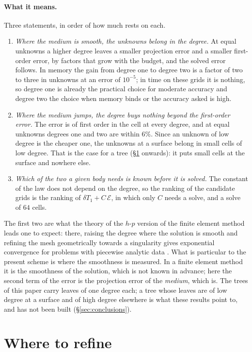 \documentclass[11pt,a4paper]{article}
\newcommand{\cE}{\mathcal{E}}
\begin{document}
\paragraph{What it means.} Three statements, in order of how much rests on each.
\begin{enumerate}
\item \emph{Where the medium is smooth, the unknowns belong in the degree.} At equal unknowns a higher
degree leaves a smaller projection error and a smaller first-order error, by factors that grow with the
budget, and the solved error follows. In memory the gain from degree one to degree two is a factor of
two to three in unknowns at an error of $10^{-5}$; in time on these grids it is nothing, so degree one
is already the practical choice for moderate accuracy and degree two the choice when memory binds or
the accuracy asked is high.
\item \emph{Where the medium jumps, the degree buys nothing beyond the first-order error.} The error is
of first order in the cell at every degree, and at equal unknowns degrees one and two are within $6\%$.
Since an unknown of low degree is the cheaper one, the unknowns at a surface belong in small cells of
low degree. That is the case for a tree (\S\ref{sec:where} onwards): it puts small cells at the surface
and nowhere else.
\item \emph{Which of the two a given body needs is known before it is solved.} The constant of the law
does not depend on the degree, so the ranking of the candidate grids is the ranking of
$\delta T_1+C\,\cE$, in which only $C$ needs a solve, and a solve of $64$ cells.
\end{enumerate}
The first two are what the theory of the $h$-$p$ version of the finite element method leads one to
expect: there, raising the degree where the solution is smooth and refining the mesh geometrically
towards a singularity gives exponential convergence for problems with piecewise analytic data
\citep{Guo1986,Babuska1994}. What is particular to the present scheme is where the smoothness is
measured. In a finite element method it is the smoothness of the solution, which is not known in
advance; here the second term of the error is the projection error of the \emph{medium}, which is. The
trees of this paper carry leaves of one degree each; a tree whose leaves are of low degree at a surface
and of high degree elsewhere is what these results point to, and has not been built
(\S\ref{sec:conclusions}).

\section{Where to refine}\label{sec:where}
\end{document}
